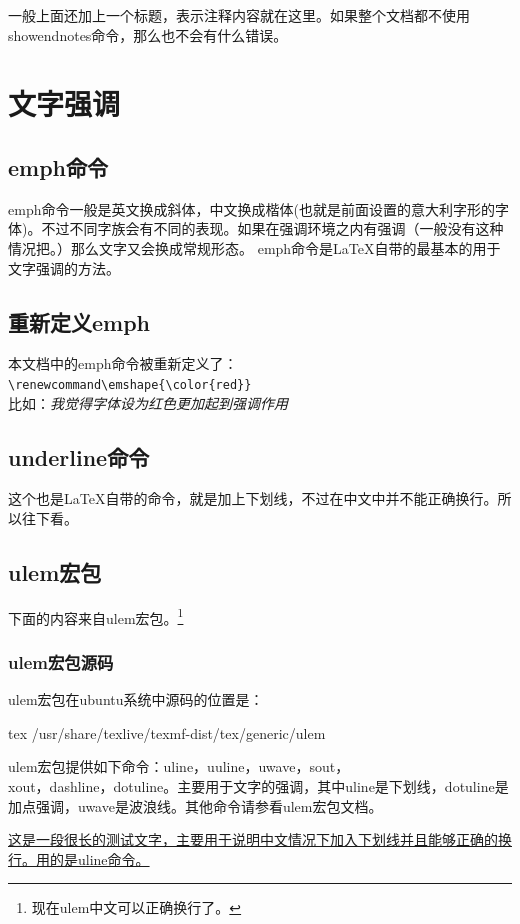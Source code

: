 \documentclass[11pt,oneside]{book}
\begin{document}
一般上面还加上一个标题，表示注释内容就在这里。如果整个文档都不使用showendnotes命令，那么也不会有什么错误。


\chapter{文字强调}
\section{emph命令}
emph命令一般是英文换成斜体，中文换成楷体(也就是前面设置的意大利字形的字体)。不过不同字族会有不同的表现。如果在强调环境之内有强调（一般没有这种情况把。）那么文字又会换成常规形态。
emph命令是\LaTeX 自带的最基本的用于文字强调的方法。


\section{重新定义emph}
本文档中的emph命令被重新定义了：\\
\verb+\renewcommand\emshape{\color{red}}+\\
比如：\emph{我觉得字体设为红色更加起到强调作用}

\section{underline命令}
这个也是\LaTeX 自带的命令，就是加上下划线，不过在中文中并不能正确换行。所以往下看。

\section{ulem宏包}
下面的内容来自ulem宏包。\footnote{现在ulem中文可以正确换行了。}

\subsection{ulem宏包源码}
ulem宏包在ubuntu系统中源码的位置是：
\begin{tcbcode}[]{tex}
/usr/share/texlive/texmf-dist/tex/generic/ulem
\end{tcbcode}

ulem宏包提供如下命令：uline，uuline，uwave，sout，\\ xout，dashline，dotuline。主要用于文字的强调，其中uline是下划线，dotuline是加点强调，uwave是波浪线。其他命令请参看ulem宏包文档。

\uline{这是一段很长的测试文字，主要用于说明中文情况下加入下划线并且能够正确的换行。用的是uline命令。}
\end{document}
